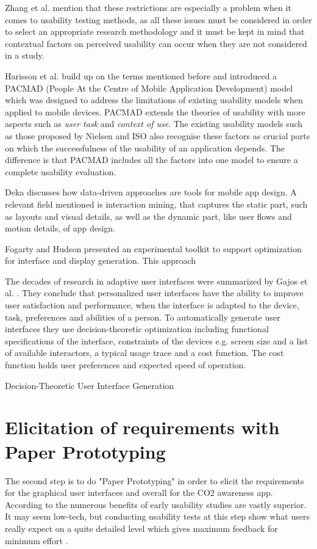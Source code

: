 Zhang et al. mention that these restrictions are especially a problem when it comes to usability testing methods, as all these issues must be considered in order to select an appropriate research methodology and it must be kept in mind that contextual factors on perceived usability can occur when they are not considered in a study.

Harisson et al. \cite{harrison2013usability} build up on the terms mentioned before and introduced a PACMAD (People At the Centre of Mobile Application Development) model which was designed to address the limitations of existing usability models when applied to mobile devices. PACMAD extends the theories of usability with more aspects such as \textit{user task} and \textit{context of use}. The existing usability models such as those proposed by Nielsen \cite{nielsen1994usability} and ISO \cite{bevan1998iso} also recognise these factors as crucial parts on which the successfulness of the usability of an application depends. The difference is that PACMAD includes all the factors into one model to ensure a complete usability evaluation.

Deka \cite{deka2016data} discusses how data-driven approaches are tools for mobile app design. A relevant field mentioned is interaction mining, that captures the static part, such as layouts and visual details, as well as the dynamic part, like user flows and motion details, of app design.

Fogarty and Hudson \cite{fogarty2003gadget} presented an experimental toolkit to support optimization for interface and display generation. This approach


The decades of research in adaptive user interfaces were summarized by Gajos et al. \cite{gajos2008decision}. They conclude that personalized user interfaces have the ability to improve user satisfaction and performance, when the interface is adapted to the device, task, preferences and abilities of a person. To automatically generate user interfaces they use decision-theoretic optimization including functional specifications of the interface, constraints of the devices e.g. screen size and a list of available interactors, a typical usage trace and a cost function. The cost function holds user preferences and expected speed of operation.



Decision-Theoretic User Interface Generation

\section{Elicitation of requirements with Paper Prototyping}
The second step is to do "Paper Prototyping" in order to elicit the requirements for the graphical user interfaces and overall for the CO2 awareness app. According to \cite{lancaster2004paper} the numerous benefits of early usability studies are vastly superior. It may seem low-tech, but conducting usability tests at this step show what users really expect on a quite detailed level which gives maximum feedback for minimum effort \cite{weiss2003handheld}.

